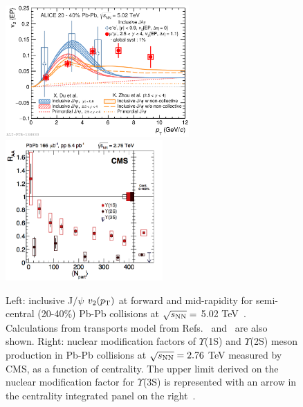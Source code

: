 \begin{figure}[!ht]
  \centering
  \includegraphics[width=7cm]{FigCap1/JPsiV2Models.pdf}
  \includegraphics[width=6cm]{FigCap1/RaaUpsilonCMS.png}
  \caption{Left: inclusive J$/\psi$ $v_2(p_{\rm T})$ at forward and mid-rapidity for semi-central (20-40\%) Pb-Pb collisions at $\sqrt{s_{\rm NN}} =$ 5.02 TeV~\cite{Acharya:2017tgv}. Calculations from transports model from Refs.~\cite{Du:2015wha} and~\cite{Zhou:2014kka} are also shown. Right: nuclear modification factors of $\Upsilon$(1S) and $\Upsilon$(2S) meson production in Pb-Pb collisions at $\sqrt{s_{\rm NN}} = 2.76$ TeV measured by CMS, as a function of centrality.
The upper limit derived on the nuclear modification factor for $\Upsilon$(3S) is represented with an arrow in the centrality integrated panel on the right~\cite{Khachatryan:2016xxp}. }
  \label{fig:JPsi}
\end{figure}

